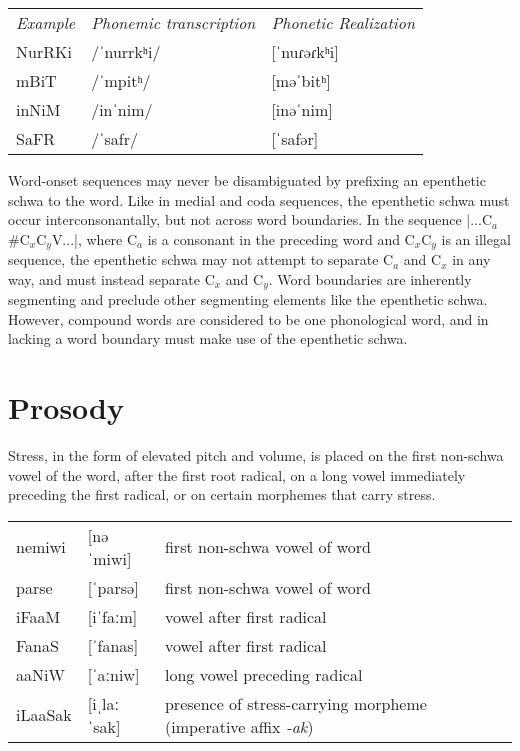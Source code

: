 \documentclass[a4paper,10pt,twoside,openright]{memoir}
\newcommand{\longv}{ː}
\newcommand\famword[1]{{\addfontfeatures{Letters=UppercaseSmallCaps}#1}}
\begin{document}
\begin{table}[ht]
    \begin{tabular}{lll}
        \textit{Example}    & \textit{Phonemic transcription}   & \textit{Phonetic Realization} \\
        \famword{NurRKi}    & /ˈnurrkʰi/                        & [ˈnuɾəɾkʰi] \\
        \famword{mBiT}      & /ˈmpitʰ/                          & [məˈbitʰ] \\
        \famword{inNiM}     & /inˈnim/                          & [inəˈnim] \\
        \famword{SaFR}      & /ˈsafr/                           & [ˈsafər] 
    \end{tabular}
\end{table}

Word-onset sequences may never be disambiguated by prefixing an epenthetic schwa to the word. Like in medial and coda sequences, the epenthetic schwa must occur interconsonantally, but not across word boundaries. In the sequence |...C$_a$\#C$_x$C$_y$V...|, where C$_a$ is a consonant in the preceding word and C$_x$C$_y$ is an illegal sequence, the epenthetic schwa may not attempt to separate C$_a$ and C$_x$ in any way, and must instead separate C$_x$ and C$_y$. Word boundaries are inherently segmenting and preclude other segmenting elements like the epenthetic schwa. However, compound words are considered to be one phonological word, and in lacking a word boundary must make use of the epenthetic schwa.

\section{Prosody}

Stress, in the form of elevated pitch and volume, is placed on the first non-schwa vowel of the word, after the first root radical, on a long vowel immediately preceding the first radical, or on certain morphemes that carry stress.

\begin{table}[ht]
    \begin{tabular}{lll}
        nemiwi & [nəˈmiwi] & first non-schwa vowel of word\\
        parse & [ˈparsə] & first non-schwa vowel of word\\
        \famword{iFaaM} & [iˈfa{\longv}m] & vowel after first radical\\
        \famword{FanaS} & [ˈfanas] & vowel after first radical\\
        \famword{aaNiW}& [ˈa{\longv}niw] & long vowel preceding radical\\
        \famword{iLaaSak} & [iˌla{\longv}ˈsak] & presence of stress-carrying morpheme (imperative affix \emph{-ak})
    \end{tabular}
\end{table}
\end{document}
